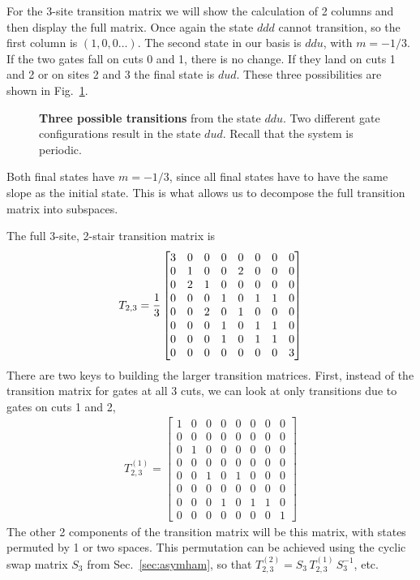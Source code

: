 For the 3-site transition matrix we will show the calculation of 2 columns and then display the full matrix. Once again the state $ddd$ cannot transition, so the first column is $(1,0,0\dots)$. The second state in our basis is $ddu$, with $m=-1/3$. If the two gates fall on cuts 0 and 1, there is no change. If they land on cuts 1 and 2 or on sites 2 and 3 the final state is $dud$. These three possibilities are shown in Fig.~\ref{fig:3trans}.
\begin{figure}
	\centering
	
	\caption{\textbf{Three possible transitions} from the state $ddu$. Two different gate configurations result in the state $dud$. Recall that the system is periodic.}
	\label{fig:3trans}
\end{figure}
Both final states have $m=-1/3$, since all final states have to have the same slope as the initial state. This is what allows us to decompose the full transition matrix into subspaces. 

The full 3-site, 2-stair transition matrix is
\begin{align}
T_{2,3} = 
\frac{1}{3}\begin{bmatrix}
	3 & 0 & 0 & 0 & 0 & 0 & 0 & 0\\
	0 & 1 & 0 & 0 & 2 & 0 & 0 & 0\\
	0 & 2 & 1 & 0 & 0 & 0 & 0 & 0\\
	0 & 0 & 0 & 1 & 0 & 1 & 1 & 0\\
	0 & 0 & 2 & 0 & 1 & 0 & 0 & 0\\
	0 & 0 & 0 & 1 & 0 & 1 & 1 & 0\\
	0 & 0 & 0 & 1 & 0 & 1 & 1 & 0\\
	0 & 0 & 0 & 0 & 0 & 0 & 0 & 3
	\end{bmatrix}
\end{align}
There are two keys to building the larger transition matrices. First, instead of the transition matrix for gates at all 3 cuts, we can look at only transitions due to gates on cuts 1 and 2,
\begin{align}
T_{2,3}^{(1)} =
\begin{bmatrix}
	1 & 0 & 0 & 0 & 0 & 0 & 0 & 0\\
	0 & 0 & 0 & 0 & 0 & 0 & 0 & 0\\
	0 & 1 & 0 & 0 & 0 & 0 & 0 & 0\\
	0 & 0 & 0 & 0 & 0 & 0 & 0 & 0\\
	0 & 0 & 1 & 0 & 1 & 0 & 0 & 0\\
	0 & 0 & 0 & 0 & 0 & 0 & 0 & 0\\
	0 & 0 & 0 & 1 & 0 & 1 & 1 & 0\\
	0 & 0 & 0 & 0 & 0 & 0 & 0 & 1
	\end{bmatrix}
\end{align}
The other 2 components of the transition matrix will be this matrix, with states permuted by 1 or two spaces. This permutation can be achieved using the cyclic swap matrix $S_3$ from Sec.~\ref{sec:asymham}, so that $T_{2,3}^{(2)}=S_3\,T_{2,3}^{(1)}\,S_3^{-1}$, etc.


